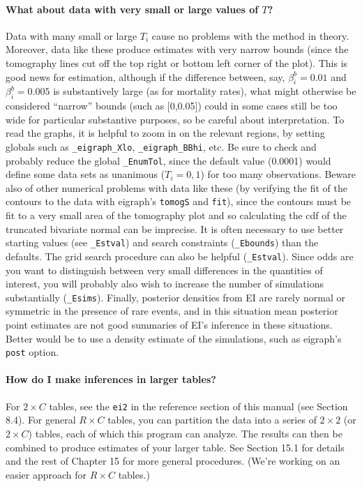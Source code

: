 \documentclass[11pt,titlepage]{article}
\begin{document}
\paragraph{What about data with very small or large values of $T$?}
Data with many small or large $T_i$ cause no problems with the method
in theory.  Moreover, data like these produce estimates with very
narrow bounds (since the tomography lines cut off the top right or
bottom left corner of the plot).  This is good news for estimation,
although if the difference between, say, $\beta_i^b=0.01$ and
$\beta_i^b=0.005$ is substantively large (as for mortality rates),
what might otherwise be considered ``narrow'' bounds (such as
[0,0.05]) could in some cases still be too wide for particular
substantive purposes, so be careful about interpretation.  To read the
graphs, it is helpful to zoom in on the relevant regions, by setting
globals such as \texttt{\_eigraph\_Xlo}, \texttt{\_eigraph\_BBhi},
etc.  Be sure to check and probably reduce the global
\texttt{\_EnumTol}, since the default value (0.0001) would define some
data sets as unanimous ($T_i=0,1$) for too many observations.  Beware
also of other numerical problems with data like these (by verifying
the fit of the contours to the data with eigraph's \texttt{tomogS} and
\texttt{fit}), since the contours must be fit to a very small area of
the tomography plot and so calculating the cdf of the truncated
bivariate normal can be imprecise.  It is often necessary to use
better starting values (see \texttt{\_Estval}) and search constraints
(\texttt{\_Ebounds}) than the defaults.  The grid search procedure can
also be helpful (\texttt{\_Estval}).  Since odds are you want to
distinguish between very small differences in the quantities of
interest, you will probably also wish to increase the number of
simulations substantially (\texttt{\_Esims}).  Finally, posterior
densities from EI are rarely normal or symmetric in the presence of
rare events, and in this situation mean posterior point estimates are
not good summaries of EI's inference in these situations.  Better
would be to use a density estimate of the simulations, such as
eigraph's \texttt{post} option.

\paragraph{How do I make inferences in larger tables?}
For $2\times C$ tables, see the \texttt{ei2} in the reference section
of this manual (see Section 8.4).  For general $R\times C$ tables, you
can partition the data into a series of $2\times 2$ (or $2\times C$)
tables, each of which this program can analyze.  The results can then
be combined to produce estimates of your larger table.  See Section
15.1 for details and the rest of Chapter 15 for more general
procedures.  (We're working on an easier approach for $R\times C$
tables.)
\end{document}
